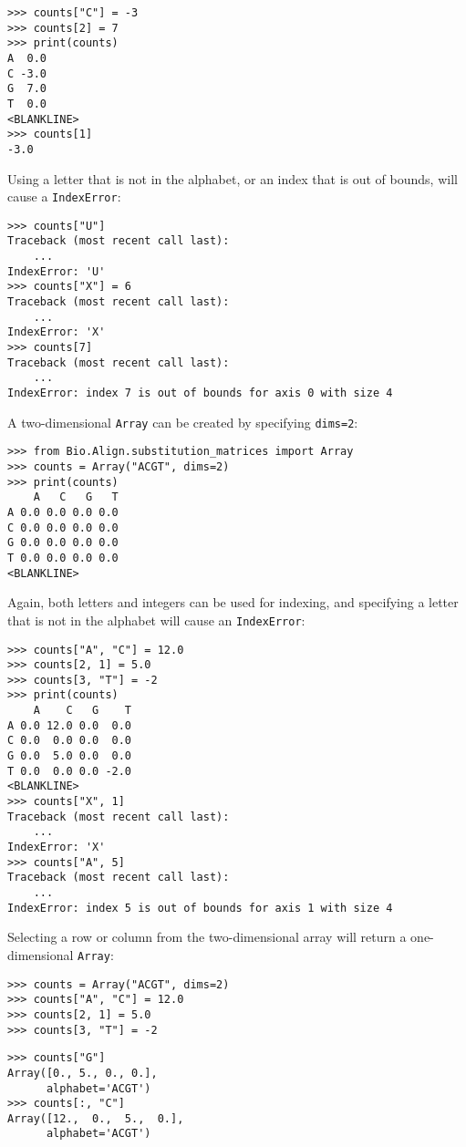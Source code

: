\begin{verbatim}
>>> counts["C"] = -3
>>> counts[2] = 7
>>> print(counts)
A  0.0
C -3.0
G  7.0
T  0.0
<BLANKLINE>
>>> counts[1]
-3.0
\end{verbatim}

Using a letter that is not in the alphabet, or an index that is out of bounds, will cause a \verb+IndexError+:

\begin{verbatim}
>>> counts["U"]
Traceback (most recent call last):
    ...
IndexError: 'U'
>>> counts["X"] = 6
Traceback (most recent call last):
    ...
IndexError: 'X'
>>> counts[7]
Traceback (most recent call last):
    ...
IndexError: index 7 is out of bounds for axis 0 with size 4
\end{verbatim}

A two-dimensional \verb+Array+ can be created by specifying \verb+dims=2+:

\begin{verbatim}
>>> from Bio.Align.substitution_matrices import Array
>>> counts = Array("ACGT", dims=2)
>>> print(counts)
    A   C   G   T
A 0.0 0.0 0.0 0.0
C 0.0 0.0 0.0 0.0
G 0.0 0.0 0.0 0.0
T 0.0 0.0 0.0 0.0
<BLANKLINE>
\end{verbatim}
Again, both letters and integers can be used for indexing, and specifying a letter that is not in the alphabet will cause an \verb+IndexError+:

\begin{verbatim}
>>> counts["A", "C"] = 12.0
>>> counts[2, 1] = 5.0
>>> counts[3, "T"] = -2
>>> print(counts)
    A    C   G    T
A 0.0 12.0 0.0  0.0
C 0.0  0.0 0.0  0.0
G 0.0  5.0 0.0  0.0
T 0.0  0.0 0.0 -2.0
<BLANKLINE>
>>> counts["X", 1]
Traceback (most recent call last):
    ...
IndexError: 'X'
>>> counts["A", 5]
Traceback (most recent call last):
    ...
IndexError: index 5 is out of bounds for axis 1 with size 4
\end{verbatim}
Selecting a row or column from the two-dimensional array will return a one-dimensional \verb+Array+:

\begin{verbatim}
>>> counts = Array("ACGT", dims=2)
>>> counts["A", "C"] = 12.0
>>> counts[2, 1] = 5.0
>>> counts[3, "T"] = -2
\end{verbatim}
\begin{verbatim}
>>> counts["G"]
Array([0., 5., 0., 0.],
      alphabet='ACGT')
>>> counts[:, "C"]
Array([12.,  0.,  5.,  0.],
      alphabet='ACGT')
\end{verbatim}


